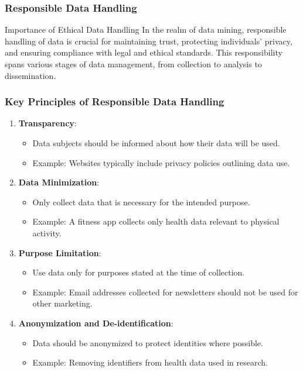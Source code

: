 \documentclass[aspectratio=169]{beamer}
\begin{document}
\begin{frame}[fragile]
  \frametitle{Responsible Data Handling}
  \begin{block}{Importance of Ethical Data Handling}
    In the realm of data mining, responsible handling of data is crucial for maintaining trust, protecting individuals' privacy, and ensuring compliance with legal and ethical standards. This responsibility spans various stages of data management, from collection to analysis to dissemination.
  \end{block}
\end{frame}

\begin{frame}[fragile]
  \frametitle{Key Principles of Responsible Data Handling}
  \begin{enumerate}
    \item \textbf{Transparency}:
      \begin{itemize}
        \item Data subjects should be informed about how their data will be used.
        \item Example: Websites typically include privacy policies outlining data use.
      \end{itemize}
    
    \item \textbf{Data Minimization}:
      \begin{itemize}
        \item Only collect data that is necessary for the intended purpose.
        \item Example: A fitness app collects only health data relevant to physical activity.
      \end{itemize}
    
    \item \textbf{Purpose Limitation}:
      \begin{itemize}
        \item Use data only for purposes stated at the time of collection.
        \item Example: Email addresses collected for newsletters should not be used for other marketing.
      \end{itemize}
    
    \item \textbf{Anonymization and De-identification}:
      \begin{itemize}
        \item Data should be anonymized to protect identities where possible.
        \item Example: Removing identifiers from health data used in research.
      \end{itemize}
    

\end{enumerate}
\end{frame}
\end{document}
